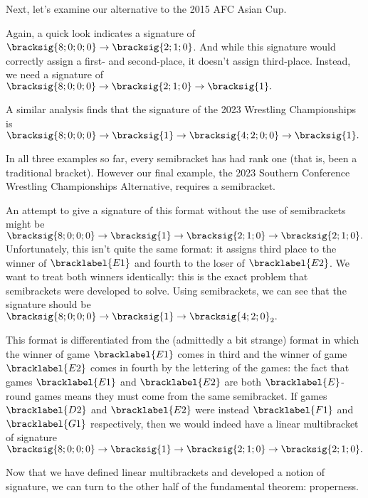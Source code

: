 {    

    Next, let's examine our alternative to the 2015 AFC Asian Cup.


    Again, a quick look indicates a signature of $\bracksig{8;0;0;0} \to \bracksig{2;1;0}$. And while this signature would correctly assign a first- and second-place, it doesn't assign third-place. Instead, we need a signature of $\bracksig{8;0;0;0} \to \bracksig{2;1;0} \to \bracksig{1}.$


    A similar analysis finds that the signature of the 2023 Wrestling Championships is $\bracksig{8;0;0;0} \to \bracksig{1} \to \bracksig{4;2;0;0} \to \bracksig{1}.$


    In all three examples so far, every semibracket has had rank one (that is, been a traditional bracket). However our final example, the 2023 Southern Conference Wrestling Championships Alternative, requires a semibracket.


    An attempt to give a signature of this format without the use of semibrackets might be $\bracksig{8;0;0;0} \to \bracksig{1} \to \bracksig{2;1;0} \to \bracksig{2;1;0}.$ Unfortunately, this isn't quite the same format: it assigns third place to the winner of $\bracklabel{E1}$ and fourth to the loser of $\bracklabel{E2}$. We want to treat both winners identically: this is the exact problem that semibrackets were developed to solve. Using semibrackets, we can see that the signature should be $\bracksig{8;0;0;0} \to \bracksig{1} \to \bracksig{4;2;0}_2.$


    This format is differentiated from the (admittedly a bit strange) format in which the winner of game $\bracklabel{E1}$ comes in third and the winner of game $\bracklabel{E2}$ comes in fourth by the lettering of the games: the fact that games $\bracklabel{E1}$ and $\bracklabel{E2}$ are both $\bracklabel{E}$-round games means they must come from the same semibracket. If games $\bracklabel{D2}$ and $\bracklabel{E2}$ were instead $\bracklabel{F1}$ and $\bracklabel{G1}$ respectively, then we would indeed have a linear multibracket of signature $\bracksig{8;0;0;0} \to \bracksig{1} \to \bracksig{2;1;0} \to \bracksig{2;1;0}.$

    Now that we have defined linear multibrackets and developed a notion of signature, we can turn to the other half of the fundamental theorem: properness.

}


